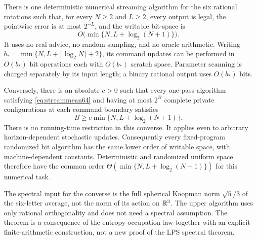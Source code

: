 \begin{theorem}\label{thm:streamspace64}
There is one deterministic numerical streaming algorithm for the six
rational rotations such that, for every $N\ge2$ and $L\ge2$, every
output is legal, the pointwise error is at most $2^{-L}$, and the
writable bit-space is
\begin{equation}\label{eq:spaceupper64}
 O\bigl(\min\{N,L+\log_2(N+1)\}\bigr).
\end{equation}
It uses no real advice, no random sampling, and no oracle arithmetic.
Writing $b_* =\min\{N,L+\lceil\log_2N\rceil+2\}$, its command updates
can be performed in $O(b_*)$ bit operations each with $O(b_*)$ scratch
space. Parameter scanning is charged separately by its input length;
a binary rational output uses $O(b_*)$ bits.

Conversely, there is an absolute $c>0$ such that every one-pass
algorithm satisfying \eqref{eq:streammean64} and having at most $2^B$
complete private configurations at each command boundary satisfies
\begin{equation}\label{eq:spacelower64}
 B\ge c\min\{N,L+\log_2(N+1)\}.
\end{equation}
There is no running-time restriction in this converse. It applies even
to arbitrary horizon-dependent stochastic updates. Consequently every
fixed-program randomized bit algorithm has the same lower order of
writable space, with machine-dependent constants. Deterministic and
randomized uniform space therefore have the common order
$\Theta(\min\{N,L+\log_2(N+1)\})$ for this numerical task.
\end{theorem}
The spectral input for the converse is the full spherical Koopman norm
$\sqrt5/3$ of the six-letter average, not the norm of its action on
$\mathbb R^3$. The upper algorithm uses only rational orthogonality and does
not need a spectral assumption. The theorem is a consequence of the
entropy occupation law together with an explicit finite-arithmetic
construction, not a new proof of the LPS spectral theorem.

